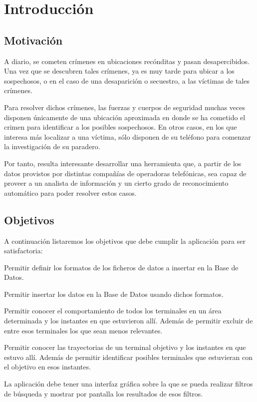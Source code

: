 \chapter{Introducción\label{CAP:INTRODUCCION}}
  
  \section{Motivación\label{SEC:MOTIVACION}}
    A diario, se cometen crímenes en ubicaciones recónditas y pasan desapercibidos. Una vez que se descubren tales crímenes, ya es muy tarde para ubicar a los sospechosos, o en el caso de una desaparición o secuestro, a las víctimas de tales crímenes.
    
    Para resolver dichos crímenes, las fuerzas y cuerpos de seguridad muchas veces disponen únicamente de una ubicación aproximada en donde se ha cometido el crimen para identificar a los posibles sospechosos. En otros casos, en los que interesa más localizar a una víctima, sólo disponen de su teléfono para comenzar la investigación de su paradero.
    
    Por tanto, resulta interesante desarrollar una herramienta que, a partir de los datos provistos por distintas compañías de operadoras telefónicas, sea capaz de proveer a un analista de información y un cierto grado de reconocimiento automático para poder resolver estos casos.
  
  
  \section{Objetivos\label{SEC:OBJETIVOS}}
    A continuación listaremos los objetivos que debe cumplir la aplicación para ser satisfactoria:
    \begin{objetive}
      \item Permitir definir los formatos de los ficheros de datos a insertar en la Base de Datos.
      \item Permitir insertar los datos en la Base de Datos usando dichos formatos.
      
      \item Permitir conocer el comportamiento de todos los terminales en un área determinada y los instantes en que estuvieron allí. Además de permitir excluir de entre esos terminales los que sean menos relevantes.
      
      \item Permitir conocer las trayectorias de un terminal objetivo y los instantes en que estuvo allí. Además de permitir identificar posibles terminales que estuvieran con el objetivo en esos instantes.

      \item La aplicación debe tener una interfaz gráfica sobre la que se pueda realizar filtros de búsqueda y mostrar por pantalla los resultados de esos filtros.
    \end{objetive}
  
